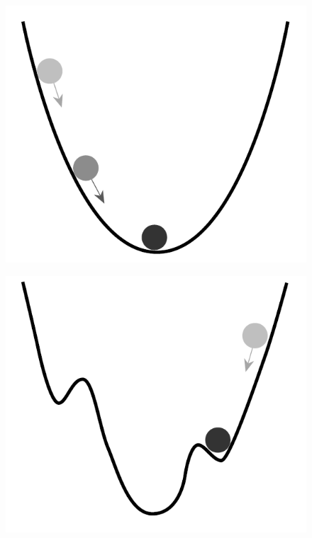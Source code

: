 \begin{figure}
\centering
\begin{minipage}{.5\textwidth}
  \centering
  \includegraphics[width=.4\linewidth]{billeder/globalMinimum.png}
  \label{fig:test1}
\end{minipage}%
\begin{minipage}{.5\textwidth}
  \centering
  \includegraphics[width=.4\linewidth]{billeder/localMinimum.png}
  \label{fig:localMinimum}
\end{minipage}
\end{figure}

